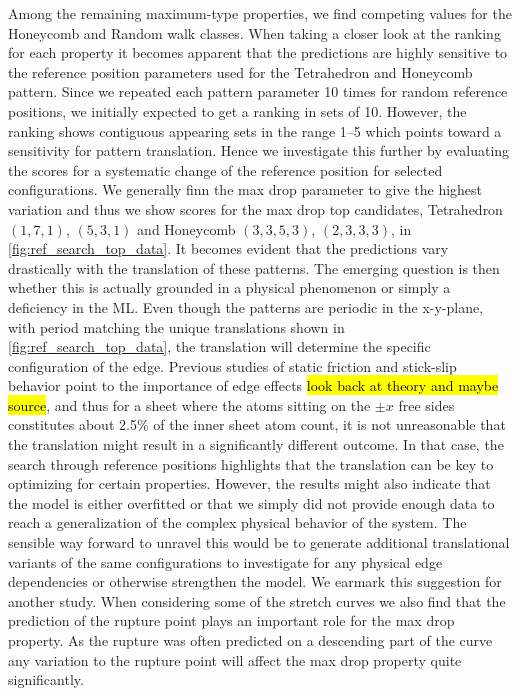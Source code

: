 Among the remaining maximum-type properties, we find competing values for the
Honeycomb and Random walk classes. When taking a closer look at the ranking for
each property it becomes apparent that the predictions are highly sensitive to
the reference position parameters used for the Tetrahedron and Honeycomb
pattern. Since we repeated each pattern parameter 10 times for random reference
positions, we initially expected to get a ranking in sets of 10. However, the
ranking shows contiguous appearing sets in the range 1--5 which points toward a
sensitivity for pattern translation. Hence we investigate this further by
evaluating the scores for a systematic change of the reference position for
selected configurations. We generally finn the max drop parameter to give the
highest variation and thus we show scores for the max drop top candidates,
Tetrahedron $(1,7,1)$, $(5,3,1)$ and Honeycomb $(3,3,5,3)$, $(2,3,3,3)$, in
\cref{fig:ref_search_top_data}. It becomes evident that the predictions vary
drastically with the translation of these patterns. The emerging question is
then whether this is actually grounded in a physical phenomenon or simply a
deficiency in the \acrshort{ML}. Even though the patterns are periodic in the
x-y-plane, with period matching the unique translations shown in
\cref{fig:ref_search_top_data}, the translation will determine the specific
configuration of the edge. Previous studies of static friction and stick-slip
behavior point to the importance of edge effects \hl{look back at theory and
maybe source}, and thus for a sheet where the atoms sitting on the $\pm x$ free
sides constitutes about 2.5\% of the inner sheet atom count, it is not
unreasonable that the translation might result in a significantly different
outcome. In that case, the search through reference positions highlights that
the translation can be key to optimizing for certain properties. However, the
results might also indicate that the model is either overfitted or that we
simply did not provide enough data to reach a generalization of the complex
physical behavior of the system. The sensible way forward to unravel this would
be to generate additional translational variants of the same configurations to
investigate for any physical edge dependencies or otherwise strengthen the
model. We earmark this suggestion for another study. When considering some of
the stretch curves we also find that the prediction of the rupture point plays
an important role for the max drop property. As the rupture was often predicted
on a descending part of the curve any variation to the rupture point will affect
the max drop property quite significantly.


